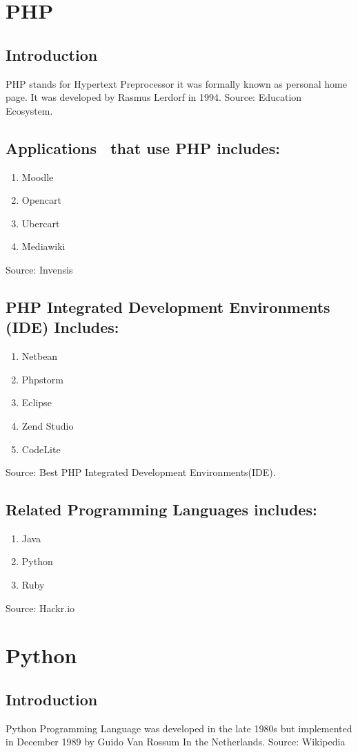 \documentclass{article}
\begin{document}
	\section{PHP}
	\subsection{Introduction}
	PHP stands for Hypertext Preprocessor it was formally known as personal home page. It was developed by Rasmus Lerdorf in 1994.
	Source: Education Ecosystem. 
	\subsection{Applications  that use PHP includes:}
	\begin{enumerate}
		\item Moodle
		\item Opencart
		\item Ubercart
		\item Mediawiki
	\end{enumerate}
Source: Invensis
\subsection{PHP Integrated Development Environments (IDE) Includes:}
\begin{enumerate}
	\item Netbean
	\item Phpstorm
	\item Eclipse
	\item Zend Studio
	\item CodeLite
\end{enumerate}
Source: Best PHP Integrated Development Environments(IDE).
\subsection{Related Programming Languages includes:}
\begin{enumerate}
	\item Java
	\item Python
	\item Ruby
\end{enumerate}
Source: Hackr.io
\section{Python}
\subsection{Introduction}
Python Programming Language was developed in the late 1980s but implemented in December 1989 by Guido Van Rossum In the Netherlands.
Source: Wikipedia
\end{document}
